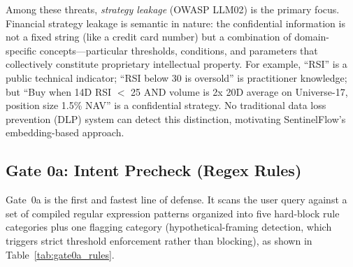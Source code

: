 \documentclass[journal]{IEEEtran}
\begin{document}
Among these threats, \textit{strategy leakage} (OWASP LLM02) is the primary focus. Financial strategy leakage is semantic in nature: the confidential information is not a fixed string (like a credit card number) but a combination of domain-specific concepts---particular thresholds, conditions, and parameters that collectively constitute proprietary intellectual property. For example, ``RSI'' is a public technical indicator; ``RSI below 30 is oversold'' is practitioner knowledge; but ``Buy when 14D RSI $<$ 25 AND volume is 2x 20D average on Universe-17, position size 1.5\% NAV'' is a confidential strategy. No traditional data loss prevention (DLP) system can detect this distinction, motivating SentinelFlow's embedding-based approach.


\subsection{Gate 0a: Intent Precheck (Regex Rules)}
\label{Sect:Gate0a}

Gate~0a is the first and fastest line of defense. It scans the user query against a set of compiled regular expression patterns organized into five hard-block rule categories plus one flagging category (hypothetical-framing detection, which triggers strict threshold enforcement rather than blocking), as shown in Table~\ref{tab:gate0a_rules}.

\begin{table}[!ht]
    \centering
    \caption{Gate 0a: Intent Precheck Rule Categories}
    \label{tab:gate0a_rules}
\end{table}
\end{document}
